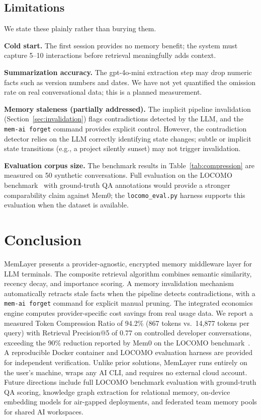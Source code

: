 \documentclass[10pt,twocolumn]{article}
\begin{document}
\subsection{Limitations}

\noindent
We state these plainly rather than burying them.

\textbf{Cold start.} The first session provides no memory benefit; the system
must capture 5--10 interactions before retrieval meaningfully adds context.

\textbf{Summarization accuracy.} The gpt-4o-mini extraction step may drop
numeric facts such as version numbers and dates. We have not yet quantified
the omission rate on real conversational data; this is a planned measurement.

\textbf{Memory staleness (partially addressed).} The implicit pipeline
invalidation (Section~\ref{sec:invalidation}) flags contradictions detected by
the LLM, and the \texttt{mem-ai forget} command provides explicit control.
However, the contradiction detector relies on the LLM correctly identifying
state changes; subtle or implicit state transitions (e.g., a project silently
sunset) may not trigger invalidation.

\textbf{Evaluation corpus size.} The benchmark results in
Table~\ref{tab:compression} are measured on 50 synthetic conversations.
Full evaluation on the LOCOMO benchmark~\citep{maharana2024locomo} with
ground-truth QA annotations would provide a stronger comparability claim
against Mem0; the \texttt{locomo\_eval.py} harness supports this evaluation
when the dataset is available.

\section{Conclusion}
\label{sec:conclusion}

\noindent
MemLayer presents a provider-agnostic, encrypted memory middleware layer for
LLM terminals. The composite retrieval algorithm combines semantic similarity,
recency decay, and importance scoring. A memory invalidation mechanism
automatically retracts stale facts when the pipeline detects contradictions,
with a \texttt{mem-ai forget} command for explicit manual pruning. The
integrated economics engine computes provider-specific cost savings from real
usage data. We report a measured Token Compression Ratio of 94.2\% (867 tokens
vs.\ 14,877 tokens per query) with Retrieval Precision@5 of 0.77 on controlled
developer conversations, exceeding the 90\% reduction reported by Mem0 on the
LOCOMO benchmark~\citep{chhikara2025mem0}. A reproducible Docker container and
LOCOMO evaluation harness are provided for independent verification. Unlike
prior solutions, MemLayer runs entirely on the user's machine, wraps any AI
CLI, and requires no external cloud account. Future directions include full
LOCOMO benchmark evaluation with ground-truth QA scoring, knowledge graph
extraction for relational memory, on-device embedding models for air-gapped
deployments, and federated team memory pools for shared AI workspaces.


\end{document}

